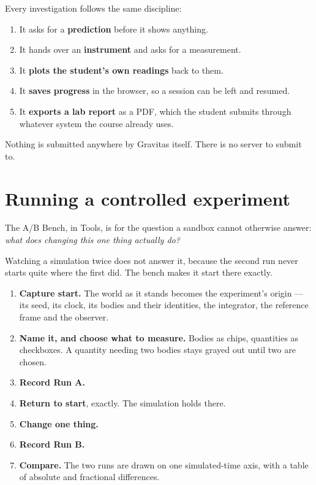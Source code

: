 \documentclass[11pt,a4paper]{article}
\newcommand{\ui}[1]{\textsf{#1}}
\begin{document}
Every investigation follows the same discipline:

\begin{enumerate}
  \item It asks for a \textbf{prediction} before it shows anything.
  \item It hands over an \textbf{instrument} and asks for a measurement.
  \item It \textbf{plots the student's own readings} back to them.
  \item It \textbf{saves progress} in the browser, so a session can be left and
  resumed.
  \item It \textbf{exports a lab report} as a PDF, which the student submits
  through whatever system the course already uses.
\end{enumerate}

Nothing is submitted anywhere by Gravitas itself. There is no server to submit
to.



\section{Running a controlled experiment}\label{sec:experiment}

The \ui{A/B Bench}, in \ui{Tools}, is for the question a sandbox cannot
otherwise answer: \emph{what does changing this one thing actually do?}

Watching a simulation twice does not answer it, because the second run never
starts quite where the first did. The bench makes it start there exactly.

\begin{enumerate}
  \item \textbf{Capture start.} The world as it stands becomes the
  experiment's origin --- its seed, its clock, its bodies and their identities,
  the integrator, the reference frame and the observer.
  \item \textbf{Name it, and choose what to measure.} Bodies as chips,
  quantities as checkboxes. A quantity needing two bodies stays grayed out
  until two are chosen.
  \item \textbf{Record Run A.}
  \item \textbf{Return to start}, exactly. The simulation holds there.
  \item \textbf{Change one thing.}
  \item \textbf{Record Run B.}
  \item \textbf{Compare.} The two runs are drawn on one simulated-time axis,
  with a table of absolute and fractional differences.
\end{enumerate}
\end{document}
